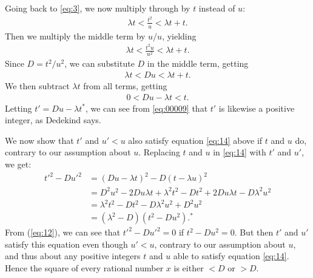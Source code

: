 \documentclass[polutonikogreek,english,twoside,openright]{article}
\begin{document}
Going back to \eqref{eq:3}, we now
multiply through by $t$ instead of $u$: 
\begin{align}
  \lambda t < \frac{t^2}{u} < \lambda t + t.\label{eq:7}
  \end{align}
Then we multiply the middle term by $u/u$, yielding
\begin{align}
  \lambda t< \frac{t^2u}{u^2} < \lambda t + t.\label{eq:8}
  \end{align}
Since $D=t^2/u^2$, we can substitute $D$ in the
middle term, getting
\begin{align}
  \label{eq:9}
  \lambda t< Du < \lambda t + t.
\end{align}
We then subtract $\lambda t$ from all terms, getting
\begin{align}
  \label{eq:00009}
0<Du-\lambda t<t.  
\end{align}
Letting $t'=Du-\lambda t^*$, we can see from \eqref{eq:00009}
that $t'$ is likewise a positive integer, as
Dedekind says.

We now show that $t'$ and $u'<u$ also satisfy equation
\eqref{eq:14} above if $t$ and $u$ do, contrary to our
assumption about $u$. Replacing
$t$ and $u$ in \eqref{eq:14} with $t'$ and $u'$, we get:
\begin{align}
  t'^2-Du'^2&=(Du-\lambda t)^2-D(t-\lambda u)^2\label{eq:10}\\
            &=D^2u^2-2Du\lambda t+\lambda^2t^2-Dt^2+2Du\lambda t-D\lambda^2u^2\label{eq:000100}\\
            &=\lambda^2t^2-Dt^2-D\lambda^2u^2+D^2u^2\label{eq:11}\\
            &=(\lambda^2-D)(t^2-Du^2).^*\label{eq:12}
\end{align}
From (\ref{eq:12}), we can see that $t'^2-Du'^2=0$ if
$t^2-Du^2=0$. But then $t'$ and $u'$ satisfy this equation even though
$u'<u$, contrary to our assumption about $u$, and thus about any
positive integers $t$ and $u$ able to satisfy equation
\eqref{eq:14}. Hence the square of every rational number $x$ is either
$<D$ or $>D$.
\end{document}

